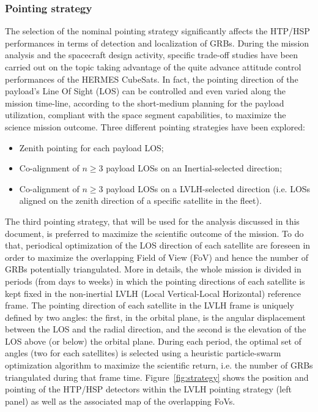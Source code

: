 \documentclass[]{spie}  %
\begin{document}
\subsubsection{Pointing strategy}
The selection of the nominal pointing strategy significantly affects the HTP/HSP performances in terms of detection and localization of GRBs. During the mission analysis and the spacecraft design activity, specific trade-off studies have been carried out on the topic taking advantage of the quite advance attitude control performances of the HERMES CubeSats. In fact, the pointing direction of the payload’s Line Of Sight (LOS) can be controlled and even varied along the mission time-line, according to the short-medium planning for the payload utilization, compliant with the space segment capabilities, to maximize the science mission outcome. 
Three different pointing strategies have been explored:
\begin{itemize} 
\item Zenith pointing for each payload LOS; 
\item Co-alignment of $n\geq3$ payload LOSs on an Inertial-selected direction; 
\item Co-alignment of $n\geq3$ payload LOSs on a LVLH-selected direction (i.e. LOSs aligned on the zenith direction of a specific satellite in the fleet).
\end{itemize} 

The third pointing strategy, that will be used for the analysis discussed in this document, is preferred to maximize the scientific outcome of the mission. To do that, periodical optimization of the LOS direction of each satellite are foreseen in order to maximize the overlapping Field of View (FoV) and hence the number of GRBs potentially triangulated. More in details, the whole mission is divided in periods (from days to weeks) in which the pointing directions of each satellite is kept fixed in the non-inertial LVLH (Local Vertical-Local Horizontal) reference frame. The pointing direction of each satellite in the LVLH frame is uniquely defined by two angles: the first, in the orbital plane, is the angular displacement between the LOS and the radial direction, and the second is the elevation of the LOS above (or below) the orbital plane. During each period, the optimal set of angles (two for each satellites) is selected using a heuristic particle-swarm optimization algorithm to maximize the scientific return, i.e. the number of GRBs triangulated during that frame time. Figure~\ref{fig:strategy} shows the position and pointing of the HTP/HSP detectors within the LVLH pointing strategy (left panel) as well as the associated map of the overlapping FoVs.  
\end{document}
